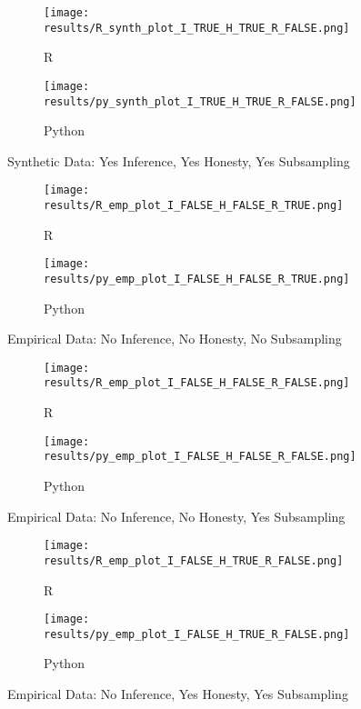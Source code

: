 \documentclass[landscape]{article}
\begin{document}
\begin{figure}
\centering
\begin{subfigure}{.5\textwidth}
  \centering
  \texttt{[image: results/R\_synth\_plot\_I\_TRUE\_H\_TRUE\_R\_FALSE.png]}
  \caption{R}
  \label{fig:sub1}
\end{subfigure}%
\begin{subfigure}{.5\textwidth}
  \centering
  \texttt{[image: results/py\_synth\_plot\_I\_TRUE\_H\_TRUE\_R\_FALSE.png]}
  \caption{Python}
  \label{fig:sub2}
\end{subfigure}
\caption{Synthetic Data: Yes Inference, Yes Honesty, Yes Subsampling}
\label{fig:test}
\end{figure}

\begin{figure}
\centering
\begin{subfigure}{.5\textwidth}
  \centering
  \texttt{[image: results/R\_emp\_plot\_I\_FALSE\_H\_FALSE\_R\_TRUE.png]}
  \caption{R}
  \label{fig:sub1}
\end{subfigure}%
\begin{subfigure}{.5\textwidth}
  \centering
  \texttt{[image: results/py\_emp\_plot\_I\_FALSE\_H\_FALSE\_R\_TRUE.png]}
  \caption{Python}
  \label{fig:sub2}
\end{subfigure}
\caption{Empirical Data: No Inference, No Honesty, No Subsampling}
\label{fig:test}
\end{figure}

\begin{figure}
\centering
\begin{subfigure}{.5\textwidth}
  \centering
  \texttt{[image: results/R\_emp\_plot\_I\_FALSE\_H\_FALSE\_R\_FALSE.png]}
  \caption{R}
  \label{fig:sub1}
\end{subfigure}%
\begin{subfigure}{.5\textwidth}
  \centering
  \texttt{[image: results/py\_emp\_plot\_I\_FALSE\_H\_FALSE\_R\_FALSE.png]}
  \caption{Python}
  \label{fig:sub2}
\end{subfigure}
\caption{Empirical Data: No Inference, No Honesty, Yes Subsampling}
\label{fig:test}
\end{figure}

\begin{figure}
\centering
\begin{subfigure}{.5\textwidth}
  \centering
  \texttt{[image: results/R\_emp\_plot\_I\_FALSE\_H\_TRUE\_R\_FALSE.png]}
  \caption{R}
  \label{fig:sub1}
\end{subfigure}%
\begin{subfigure}{.5\textwidth}
  \centering
  \texttt{[image: results/py\_emp\_plot\_I\_FALSE\_H\_TRUE\_R\_FALSE.png]}
  \caption{Python}
  \label{fig:sub2}
\end{subfigure}
\caption{Empirical Data: No Inference, Yes Honesty, Yes Subsampling}
\label{fig:test}
\end{figure}
\end{document}
